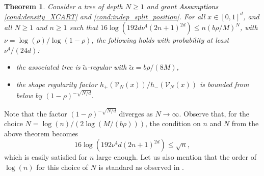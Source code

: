 \documentclass[paper=a4, fontsize=11pt]{scrartcl}
\newcommand{\PP}{\mathbb{P}}
\newtheorem{theorem}{Theorem}
\newcommand{\rev}[1]{\textcolor{black}{#1}}
\begin{document}
\begin{theorem}\label{Wager_subopt}
Consider a tree of depth $N \geq 1$ and grant \rev{Assumptions} \ref{cond:density_XCART} and \ref{cond:indep_split_position}. For all $x\in  [0,1]^d$, and all $N \geq 1$ and $n \geq 1$ such that $16\log( 192d \nu^4 (2n+1)^{2d}) \leq n (b\rho / M ) ^{N} $,
with $\nu = \log(\rho)/\log(1-\rho)$, the following holds with probability at least $\nu^4/(24d)$: 
\begin{itemize}
    \item[(i)] the associated tree is $\tilde{\alpha}$-regular with $\tilde{\alpha} = {b\rho}/{(8M)}$,
    \item[(ii)] the shape regularity factor ${h_+(\mathcal V _ N (x) )}/{h_-(\mathcal V_N (x) )}$ is bounded from below by $(1-\rho)^{-\sqrt{N/d}}.$ 
\end{itemize} 
\end{theorem}


Note that the factor $(1-\rho)^{-\sqrt{N/d}}$ diverges as $N \to \infty$. Observe that, for the choice $N = \log(n)/(2 \log(M/(b\rho)))$, the condition on $n$  and $N$ from the above theorem becomes $$ 16\log(192 \nu ^4 d (2n+1)^{2d} ) \leq \sqrt{n},$$ which is easily satisfied for $n$ large enough. Let us also mention that the order of $\log(n)$ for this choice of $N$ is standard as observed in \cite{biau2012analysis,wager2018estimation}.
\end{document}
